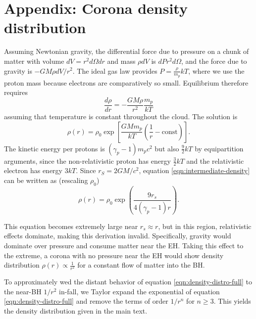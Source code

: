 \documentclass[twocolumn,twocolappendix]{aastex631}
\newcommand{\parens}[1]{\left(#1\right)}
\newcommand{\brackets}[1]{\left[#1\right]}
\begin{document}
\section*{Appendix: Corona density distribution}
\label{app:corona-density}
Assuming Newtonian gravity, the differential force due to pressure on a chunk of matter with volume $dV = r^2 d\Omega dr$ and mass $\rho dV$ is $dP r^2 d\Omega$, and the force due to gravity is $-GM\rho dV / r^2$. The ideal gas law provides $P = \frac{\rho}{m_p}kT$, where we use the proton mass because electrons are comparatively so small. Equilibrium therefore requires
\begin{equation}
  \frac{d\rho}{dr} = -\frac{GM\rho}{r^2}\frac{m_p}{kT}
\end{equation}
assuming that temperature is constant throughout the cloud. The solution is
\begin{equation}
  \rho(r) = \rho_0 \exp \brackets{\frac{GMm_p}{kT}\parens{\frac{1}{r}-\text{const}}}.
  \label{eqn:intermediate-density}
\end{equation}
The kinetic energy per protons is $(\gamma_p-1) m_p c^2$ but also $\frac{9}{2}kT$ by equipartition arguments, since the non-relativistic proton has energy $\frac{3}{2}kT$ and the relativistic electron has energy $3kT$. Since $r_S = 2GM/c^2$, equation \ref{eqn:intermediate-density} can be written as (rescaling $\rho_0$)
\begin{equation}
  \rho(r) = \rho_0 \exp \parens{\frac{9r_s}{4(\gamma_p-1) r}}.
  \label{eqn:density-distro-full}
\end{equation}

This equation becomes extremely large near $r_s \approx r$, but in this region, relativistic effects dominate, making this derivation invalid. Specifically, gravity would dominate over pressure and consume matter near the EH. Taking this effect to the extreme, a corona with no pressure near the EH would show density distribution $\rho(r) \propto \frac{1}{r^2}$ for a constant flow of matter into the BH.

To approximately wed the distant behavior of equation \ref{eqn:density-distro-full} to the near-BH $1/r^2$ in-fall, we Taylor expand the exponential of equation \ref{eqn:density-distro-full} and remove the terms of order $1/r^n$ for $n\geq 3$. This yields the density distribution given in the main text.

{}

\end{document}
